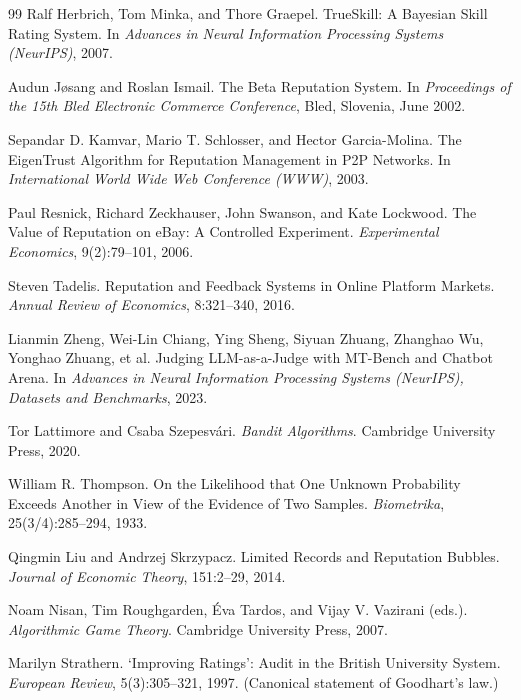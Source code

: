 \documentclass[11pt,a4paper]{article}
\theoremstyle{definition}
\begin{document}
\begin{thebibliography}{99}
Ralf Herbrich, Tom Minka, and Thore Graepel.
\newblock TrueSkill: A Bayesian Skill Rating System.
\newblock In \textit{Advances in Neural Information Processing Systems (NeurIPS)}, 2007.

Audun Jøsang and Roslan Ismail.
\newblock The Beta Reputation System.
\newblock In \textit{Proceedings of the 15th Bled Electronic Commerce Conference}, Bled, Slovenia, June 2002.

Sepandar D. Kamvar, Mario T. Schlosser, and Hector Garcia-Molina.
\newblock The EigenTrust Algorithm for Reputation Management in P2P Networks.
\newblock In \textit{International World Wide Web Conference (WWW)}, 2003.

Paul Resnick, Richard Zeckhauser, John Swanson, and Kate Lockwood.
\newblock The Value of Reputation on eBay: A Controlled Experiment.
\newblock \textit{Experimental Economics}, 9(2):79--101, 2006.

Steven Tadelis.
\newblock Reputation and Feedback Systems in Online Platform Markets.
\newblock \textit{Annual Review of Economics}, 8:321--340, 2016.

Lianmin Zheng, Wei-Lin Chiang, Ying Sheng, Siyuan Zhuang, Zhanghao Wu, Yonghao Zhuang, et al.
\newblock Judging LLM-as-a-Judge with MT-Bench and Chatbot Arena.
\newblock In \textit{Advances in Neural Information Processing Systems (NeurIPS), Datasets and Benchmarks}, 2023.

Tor Lattimore and Csaba Szepesv\'ari.
\newblock \textit{Bandit Algorithms}.
\newblock Cambridge University Press, 2020.

William R. Thompson.
\newblock On the Likelihood that One Unknown Probability Exceeds Another in View of the Evidence of Two Samples.
\newblock \textit{Biometrika}, 25(3/4):285--294, 1933.

Qingmin Liu and Andrzej Skrzypacz.
\newblock Limited Records and Reputation Bubbles.
\newblock \textit{Journal of Economic Theory}, 151:2--29, 2014.

Noam Nisan, Tim Roughgarden, \'Eva Tardos, and Vijay V. Vazirani (eds.).
\newblock \textit{Algorithmic Game Theory}.
\newblock Cambridge University Press, 2007.

Marilyn Strathern.
\newblock `Improving Ratings': Audit in the British University System.
\newblock \textit{European Review}, 5(3):305--321, 1997. (Canonical statement of Goodhart's law.)


\end{thebibliography}
\end{document}
